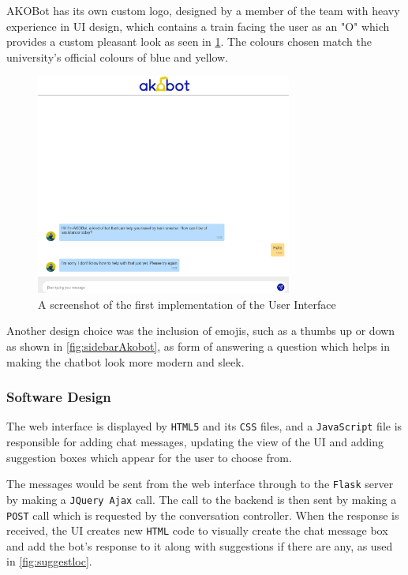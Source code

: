 \documentclass[11pt]{article}
\newcommand{\code}[1]{{\texttt{#1}}}
\begin{document}
        AKOBot has its own custom logo, designed by a member of the team with heavy experience in UI design, which contains a train facing the user as an "O" which provides a custom pleasant look as seen in \cref{fig:AKObot_firstui}. The colours chosen match the university's official colours of blue and yellow.
        
        \begin{figure}[!ht]
            \centering
            \includegraphics[width=0.75\textwidth]{AKObot_UI.PNG}
            \caption{A screenshot of the first implementation of the User Interface}
            \label{fig:AKObot_firstui}
        \end{figure}
        
        Another design choice was the inclusion of emojis, such as a thumbs up or down as shown in \cref{fig:sidebarAkobot}, as form of answering a question which helps in making the chatbot look more modern and sleek.
    
        \subsubsection{Software Design}\label{sec:UIDesignSD}
        The web interface is displayed by \code{HTML5} and its \code{CSS} files, and a \code{JavaScript} file is responsible for adding chat messages, updating the view of the UI and adding suggestion boxes which appear for the user to choose from. 
        
        The messages would be sent from the web interface through to the \code{Flask} server by making a \code{JQuery Ajax} call. The call to the backend is then sent by making a \code{POST} call which is requested by the conversation controller. When the response is received, the UI creates new \code{HTML} code to visually create the chat message box and add the bot's response to it along with suggestions if there are any, as used in \cref{fig:suggestloc}.
        
\end{document}
